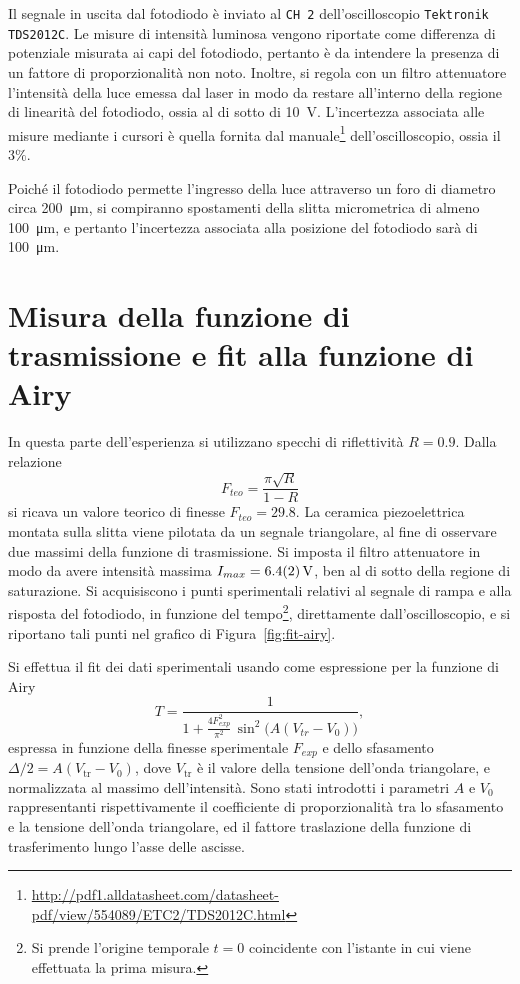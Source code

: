 \documentclass[10pt,oneside,a4paper]{article}
\begin{document}
\begin{multicols}{2}
Il segnale in uscita dal fotodiodo è inviato al \texttt{CH 2} dell'oscilloscopio \texttt{Tektronik TDS2012C}. Le misure di intensità luminosa vengono riportate come differenza di potenziale misurata ai capi del fotodiodo, pertanto è da intendere la presenza di un fattore di proporzionalità non noto. Inoltre, si regola con un filtro attenuatore l'intensità della luce emessa dal laser in modo da restare all'interno della regione di linearità del fotodiodo, ossia al di sotto di \SI{10}{V}. L'incertezza associata alle misure mediante i cursori è quella fornita dal manuale\footnote{\url{http://pdf1.alldatasheet.com/datasheet-pdf/view/554089/ETC2/TDS2012C.html}} dell'oscilloscopio, ossia il $3\%$.

Poiché il fotodiodo permette l'ingresso della luce attraverso un foro di diametro circa \SI{200}{\micro m}, si compiranno spostamenti della slitta micrometrica di almeno \SI{100}{\micro m}, e pertanto l'incertezza associata alla posizione del fotodiodo sarà di \SI{100}{\micro m}.

\section{Misura della funzione di trasmissione e fit alla funzione di Airy}
In questa parte dell'esperienza si utilizzano specchi di riflettività $R=0.9$. Dalla relazione 
\begin{equation}\label{eq:finesse}
F_{teo} = \frac{\pi\sqrt R}{1-R}
\end{equation}
si ricava un valore teorico di finesse $F_{teo} = 29.8$. La ceramica piezoelettrica montata sulla slitta viene pilotata da un segnale triangolare, al fine di osservare due massimi della funzione di trasmissione. Si imposta il filtro attenuatore in modo da avere intensità massima $I_{max} = \SI{6.4\pm0.2}{V}$, ben al di sotto della regione di saturazione. Si acquisiscono i punti sperimentali relativi al segnale di rampa e alla risposta del fotodiodo, in funzione del tempo\footnote{Si prende l'origine temporale $t=0$ coincidente con l'istante in cui viene effettuata la prima misura.}, direttamente dall'oscilloscopio, e si riportano tali punti nel grafico di Figura~\ref{fig:fit-airy}.

Si effettua il fit dei dati sperimentali usando come espressione per la funzione di Airy \begin{equation}\label{eqn:airy}
T=\frac{1}{1+\frac{4F_{exp}^2}{\pi^2}\,\sin^2\big(A(V_{tr}-V_0)\big)},
\end{equation}
espressa in funzione della finesse sperimentale $F_{exp}$ e dello sfasamento $\Delta/2 = A(V_{\text{tr}}-V_0)$, dove $V_{\text{tr}}$ è il valore della tensione dell'onda triangolare, e normalizzata al massimo dell'intensità. Sono stati introdotti i parametri $A$ e $V_0$ rappresentanti rispettivamente il coefficiente di proporzionalità tra lo sfasamento e la tensione dell'onda triangolare, ed il fattore traslazione della funzione di trasferimento lungo l'asse delle ascisse. 


\end{multicols}
\end{document}

